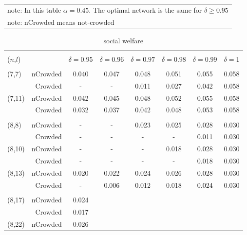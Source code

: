 \documentclass[12pt,letter]{article}
\theoremstyle{remark}
\theoremstyle{remark}
\theoremstyle{claim}
\begin{document}
\begin{table}[htbp]
\begin{center}
\begin{tabular}{ccc}
\\ \hline
  &  & \\ \hline \hline
\multicolumn{3}{l}{note: In this table $\alpha=0.45$. The optimal network is the same for $\delta\geq 0.95$}\\
\multicolumn{3}{l}{note: nCrowded means not-crowded}
\end{tabular}
\end{center}
\end{table}


\begin{table}[htbp]
\caption{social welfare}
\label{table_ops}
\begin{tabular}{lrcccccc}
&  &  &  &  &  &  & \\ 
($n$,$l$) 	&  & $\delta=0.95$ & $\delta=0.96$ & $\delta=0.97$ & $\delta=0.98$ & $\delta=0.99$ & $\delta=1$\\ \hline\hline
 		&  &  &  &  &  &  & \\ 
(7,7)	 & nCrowded & 0.040 & 0.047 & 0.048 & 0.051 & 0.055 & 0.058\\ 
 		& Crowded & - & - & 0.011 & 0.027 & 0.042 & 0.058\\ 
(7,11) & nCrowded & 0.042 & 0.045 & 0.048 & 0.052 & 0.055 & 0.058\\ 
 & Crowded & 0.032 & 0.037 & 0.042 & 0.048 & 0.053 & 0.058\\ \hline
 &  &  &  &  &  &  & \\ 
(8,8) & nCrowded & - & - & 0.023 & 0.025 & 0.028 & 0.030\\ 
 & Crowded & - & - & - & - & 0.011 & 0.030\\ 
(8,10) & nCrowded & - & - & - & 0.018 & 0.028 & 0.030\\ 
 & Crowded & - & - & - & - & 0.018 & 0.030\\ 
(8,13) & nCrowded & 0.020 & 0.022 & 0.024 & 0.026 & 0.028 & 0.030\\ 
 & Crowded & - & 0.006 & 0.012 & 0.018 & 0.024 & 0.030\\ \hline
  &  &  &  &  &  &  & \\ 
(8,17) & nCrowded & 0.024 & \cellcolor{Gray} & \cellcolor{Gray}  & \cellcolor{Gray} & \cellcolor{Gray} & \cellcolor{Gray}\\ 
 & Crowded & 0.017 & \cellcolor{Gray} & \cellcolor{Gray} & \cellcolor{Gray} & \cellcolor{Gray} & \cellcolor{Gray}\\ 
(8,22) & nCrowded & 0.026 & \cellcolor{Gray} & \cellcolor{Gray} & \cellcolor{Gray} & \cellcolor{Gray} & \cellcolor{Gray}\\ 

\end{tabular}
\end{table}
\end{document}
